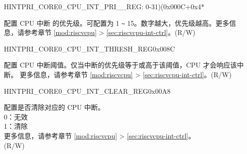 \begin{register}{H}{INTPRI\_CORE0\_CPU\_INT\_PRI\_\_REG}{: 0-31)(0x000C+0x4*}\label{regdesc:INTPRICORE0CPUINTPRINREG}
%
%
\regnewline%
\begin{regdesc}\begin{reglist}
\label{fielddesc:INTERRUPTCORENCPUPRI0MAP}\item [INTPRI\_CORE0\_CPU\_PRI\_\regindex{n}\_MAP] 配置 CPU 中断  的优先级。可配置为 1 \verb+~+ 15。数字越大，优先级越高。更多信息，请参考章节 \ref{mod:riscvcpu} \textit{} >  \ref{sec:riscvcpu-int-ctrl}\textit{}。(R/W)
\end{reglist}\end{regdesc}
\end{register}


\begin{register}{H}{INTPRI\_CORE0\_CPU\_INT\_THRESH\_REG}{0x008C}\label{regdesc:INTPRICORE0CPUINTTHRESHREG}
%
%
\regnewline%
\begin{regdesc}\begin{reglist}
\label{fielddesc:INTPRICORE0CPUINTTHRESH}\item [INTPRI\_CORE0\_CPU\_INT\_THRESH] 配置 CPU 中断阈值。仅当中断的优先级等于或高于该阈值，CPU 才会响应该中断。 更多信息，请参考章节 \ref{mod:riscvcpu} \textit{} >  \ref{sec:riscvcpu-int-ctrl}\textit{}。(R/W)
\end{reglist}\end{regdesc}
\end{register}




\begin{register}{H}{INTPRI\_CORE0\_CPU\_INT\_CLEAR\_REG}{0x00A8}\label{regdesc:INTPRICORE0CPUINTCLEARREG}
%
\regnewline%
\begin{regdesc}\begin{reglist}
\label{fielddesc:INTPRICORE0CPUINTCLEAR}\item [INTPRI\_CORE0\_CPU\_INT\_CLEAR] 配置是否清除对应的 CPU 中断。\\
0：无效\\
1：清除\\
更多信息，请参考章节 \ref{mod:riscvcpu} \textit{} >  \ref{sec:riscvcpu-int-ctrl}\textit{}。\\
(R/W)
\end{reglist}\end{regdesc}
\end{register}


